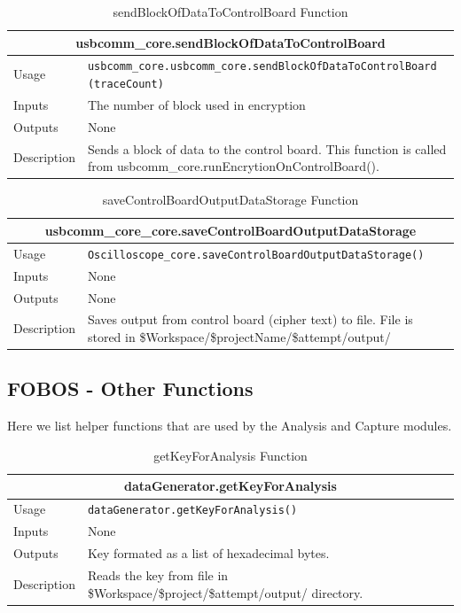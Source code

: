 \documentclass{llncs}
\numberwithin{algorithm}{chapter}
\begin{document}
\begin{table}[H]
\caption{sendBlockOfDataToControlBoard Function}
\begin{tabular}{ |p{2cm}||p{11cm}|  }
 \hline
 \multicolumn{2}{|c|}{\cellcolor{teal}\textbf{usbcomm\_core.sendBlockOfDataToControlBoard}} \\
 \hline
 Usage & \texttt{usbcomm\_core.usbcomm\_core.sendBlockOfDataToControlBoard
 (traceCount)}\\ \hline
 Inputs & The number of block used in encryption \\ \hline
 Outputs &  None \\ \hline
 Description & Sends a block of data to the control board. 
 This function is called from usbcomm\_core.runEncrytionOnControlBoard(). \\ \hline
\end{tabular}
\end{table}

\begin{table}[H]
\caption{saveControlBoardOutputDataStorage Function}
\begin{tabular}{ |p{2cm}||p{11cm}|  }
 \hline
 \multicolumn{2}{|c|}{\cellcolor{teal}\textbf{usbcomm\_core\_core.saveControlBoardOutputDataStorage}} \\
 \hline
 Usage & \texttt{Oscilloscope\_core.saveControlBoardOutputDataStorage()}\\ \hline
 Inputs & None \\ \hline
 Outputs &  None \\ \hline
 Description & Saves output from control board (cipher text) to file. File is stored in \$Workspace/\$projectName/\$attempt/output/ \\ \hline
\end{tabular}
\end{table}


\subsection{FOBOS - Other Functions}

Here we list helper functions that are used by the Analysis and Capture modules.

\begin{table}[H]
\caption{getKeyForAnalysis Function}
\begin{tabular}{ |p{2cm}||p{11cm}|  }
 \hline
 \multicolumn{2}{|c|}{\cellcolor{teal}\textbf{dataGenerator.getKeyForAnalysis}} \\
 \hline
 Usage & \texttt{dataGenerator.getKeyForAnalysis()}\\ \hline
 Inputs & None \\ \hline
 Outputs & Key formated as a list of hexadecimal bytes.  \\ \hline
 Description & Reads the key from file in \$Workspace/\$project/\$attempt/output/ directory. \\ \hline
\end{tabular}
\end{table}
\end{document}
